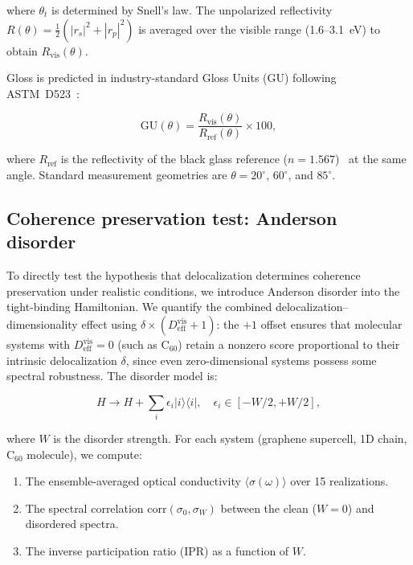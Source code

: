 \documentclass[twocolumn,showpacs,preprintnumbers,amsmath,amssymb,prb]{revtex4-2}
\begin{document}
\noindent where $\theta_t$ is determined by Snell's law. The
unpolarized reflectivity $R(\theta) = \frac{1}{2}(|r_s|^2 + |r_p|^2)$
is averaged over the visible range (1.6--3.1~eV) to obtain
$R_\mathrm{vis}(\theta)$.

Gloss is predicted in industry-standard Gloss Units (GU) following
ASTM~D523~\cite{ASTM_D523}:

\begin{equation}
  \mathrm{GU}(\theta) = \frac{R_\mathrm{vis}(\theta)}
    {R_\mathrm{ref}(\theta)} \times 100,
  \label{eq:GU}
\end{equation}

\noindent where $R_\mathrm{ref}$ is the reflectivity of the black
glass reference ($n = 1.567$)~\cite{ASTM_D523} at the same angle. Standard measurement
geometries are $\theta = 20^\circ$, $60^\circ$, and $85^\circ$.

\subsection{Coherence preservation test: Anderson disorder}

To directly test the hypothesis that delocalization determines
coherence preservation under realistic conditions, we introduce
Anderson disorder into the tight-binding Hamiltonian.
We quantify the combined delocalization--dimensionality effect
using $\delta \times (D_\mathrm{eff}^\mathrm{vis} + 1)$: the $+1$
offset ensures that molecular systems with
$D_\mathrm{eff}^\mathrm{vis} = 0$ (such as C$_{60}$) retain a
nonzero score proportional to their intrinsic delocalization $\delta$,
since even zero-dimensional systems possess some spectral robustness.
The disorder model is:

\begin{equation}
  H \to H + \sum_i \epsilon_i |i\rangle\langle i|,
  \quad \epsilon_i \in [-W/2, +W/2],
  \label{eq:anderson}
\end{equation}

\noindent where $W$ is the disorder strength. For each system (graphene
supercell, 1D chain, C$_{60}$ molecule), we compute:

\begin{enumerate}
  \item The ensemble-averaged optical conductivity $\langle\sigma(\omega)\rangle$
    over 15 realizations.
  \item The spectral correlation $\mathrm{corr}(\sigma_0, \sigma_W)$
    between the clean ($W=0$) and disordered spectra.
  \item The inverse participation ratio (IPR) as a function of $W$.
\end{enumerate}
\end{document}
